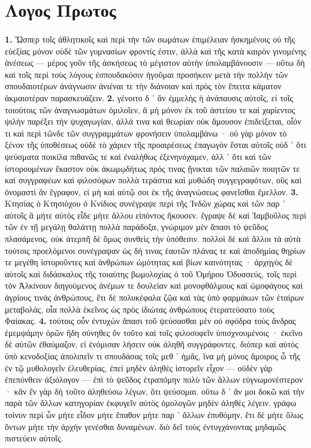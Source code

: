 \documentclass[a4paper, 11pt, oneside, polutonikogreek, german]{article}
\begin{document}
\section{Λογος Πρωτος}
\paragraph{}
\textbf{1.} Ὥσπερ τοῖς ἀθλητικοῖς καὶ περὶ τὴν τῶν σωμάτων ἐπιμέλειαν ἠσκημένοις οὐ τῆς εὐεξίας μόνον οὐδὲ τῶν γυμνασίων φροντίς ἐστιν, ἀλλὰ καὶ τῆς κατὰ καιρὸν γινομένης ἀνέσεως --- μέρος γοῦν τῆς ἀσκήσεως τὸ μέγιστον αὐτὴν ὑπολαμβάνουσιν --- οὕτω δὴ καὶ τοῖς περὶ τοὺς λόγους ἐσπουδακόσιν ἡγοῦμαι προσήκειν μετὰ τὴν πολλὴν τῶν σπουδαιοτέρων ἀνάγνωσιν ἀνιέναι τε τὴν διάνοιαν καὶ πρὸς τὸν ἔπειτα κάματον ἀκμαιοτέραν παρασκευάζειν. \textbf{2.} γένοιτο δ ᾽ ἂν ἐμμελὴς ἡ ἀνάπαυσις αὐτοῖς, εἰ τοῖς τοιούτοις τῶν ἀναγνωσμάτων ὁμιλοῖεν, ἃ μὴ μόνον ἐκ τοῦ ἀστείου τε καὶ χαρίεντος ψιλὴν παρέξει τὴν ψυχαγωγίαν, ἀλλά τινα καὶ θεωρίαν οὐκ ἄμουσον ἐπιδείξεται, οἷόν τι καὶ περὶ τῶνδε τῶν συγγραμμάτων φρονήσειν ὑπολαμβάνω · οὐ γὰρ μόνον τὸ ξένον τῆς ὑποθέσεως οὐδὲ τὸ χάριεν τῆς προαιρέσεως ἐπαγωγὸν ἔσται αὐτοῖς οὐδ ᾽ ὅτι ψεύσματα ποικίλα πιθανῶς τε καὶ ἐναλήθως ἐξενηνόχαμεν, ἀλλ ᾽ ὅτι καὶ τῶν ἱστορουμένων ἕκαστον οὐκ ἀκωμῳδήτως πρός τινας ᾔνικται τῶν παλαιῶν ποιητῶν τε καὶ συγγραφέων καὶ φιλοσόφων πολλὰ τεράστια καὶ μυθώδη συγγεγραφότων, οὓς καὶ ὀνομαστὶ ἂν ἔγραφον, εἰ μὴ καὶ αὐτῷ σοι ἐκ τῆς ἀναγνώσεως φανεῖσθαι ἔμελλον. \textbf{3.} Κτησίας ὁ Κτησιόχου ὁ Κνίδιος συνέγραψε περὶ τῆς Ἰνδῶν χώρας καὶ τῶν παρ ᾽ αὐτοῖς ἃ μήτε αὐτὸς εἶδε μήτε ἄλλου εἰπόντος ἤκουσεν. ἔγραψε δὲ καὶ Ἰαμβοῦλος περὶ τῶν ἐν τῇ μεγάλῃ θαλάττῃ πολλὰ παράδοξα, γνώριμον μὲν ἅπασι τὸ ψεῦδος πλασάμενος, οὐκ ἀτερπῆ δὲ ὅμως συνθεὶς τὴν ὑπόθεσιν. πολλοὶ δὲ καὶ ἄλλοι τὰ αὐτὰ τούτοις προελόμενοι συνέγραψαν ὡς δή τινας ἑαυτῶν πλάνας τε καὶ ἀποδημίας θηρίων τε μεγέθη ἱστοροῦντες καὶ ἀνθρώπων ὠμότητας καὶ βίων καινότητας · ἀρχηγὸς δὲ αὐτοῖς καὶ διδάσκαλος τῆς τοιαύτης βωμολοχίας ὁ τοῦ Ὁμήρου Ὀδυσσεύς, τοῖς περὶ τὸν Ἀλκίνουν διηγούμενος ἀνέμων τε δουλείαν καὶ μονοφθάλμους καὶ ὠμοφάγους καὶ ἀγρίους τινὰς ἀνθρώπους, ἔτι δὲ πολυκέφαλα ζῷα καὶ τὰς ὑπὸ φαρμάκων τῶν ἑταίρων μεταβολάς, οἷα πολλὰ ἐκεῖνος ὡς πρὸς ἰδιώτας ἀνθρώπους ἐτερατεύσατο τοὺς Φαίακας. \textbf{4.} τούτοις οὖν ἐντυχὼν ἅπασι τοῦ ψεύσασθαι μὲν οὐ σφόδρα τοὺς ἄνδρας ἐμεμψάμην ὁρῶν ἤδη σύνηθες ὂν τοῦτο καὶ τοῖς φιλοσοφεῖν ὑπισχνουμένοις · ἐκεῖνο δὲ αὐτῶν ἐθαύμαζον, εἰ ἐνόμισαν λήσειν οὐκ ἀληθῆ συγγράφοντες. διόπερ καὶ αὐτὸς ὑπὸ κενοδοξίας ἀπολιπεῖν τι σπουδάσας τοῖς μεθ ᾽ ἡμἄς, ἵνα μὴ μόνος ἄμοιρος ὦ τῆς ἐν τῷ μυθολογεῖν ἐλευθερίας, ἐπεὶ μηδὲν ἀληθὲς ἱστορεῖν εἶχον --- οὐδὲν γὰρ ἐπεπόνθειν ἀξιόλογον --- ἐπὶ τὸ ψεῦδος ἐτραπόμην πολὺ τῶν ἄλλων εὐγνωμονέστερον · κἂν ἓν γὰρ δὴ τοῦτο ἀληθεύσω λέγων, ὅτι ψεύσομαι. οὕτω δ ᾽ ἄν μοι δοκῶ καὶ τὴν παρὰ τῶν ἄλλων κατηγορίαν ἐκφυγεῖν αὐτὸς ὁμολογῶν μηδὲν ἀληθὲς λέγειν. γράφω τοίνυν περὶ ὧν μήτε εἶδον μήτε ἔπαθον μήτε παρ ᾽ ἄλλων ἐπυθόμην, ἔτι δὲ μήτε ὅλως ὄντων μήτε τὴν ἀρχὴν γενέσθαι δυναμένων. διὸ δεῖ τοὺς ἐντυγχάνοντας μηδαμῶς πιστεύειν αὐτοῖς.
\end{document}
